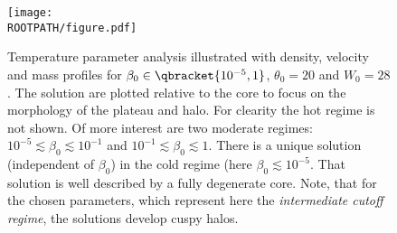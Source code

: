 \begin{figure}%
	\centering%
	\texttt{[image: \\ROOTPATH/figure.pdf]}
	\caption{Temperature parameter analysis illustrated with density, velocity and mass profiles for $\beta_0\in\qbracket{10^{-5},1}$, $\theta_0 = 20$ and $W_0 = 28$. The solution are plotted relative to the core to focus on the morphology of the plateau and halo. For clearity the hot regime is not shown. Of more interest are two moderate regimes: $10^{-5} \lesssim \beta_0 \lesssim 10^{-1}$ and $10^{-1} \lesssim \beta_0 \lesssim 1$. There is a unique solution (independent of $\beta_0$) in the cold regime (here $\beta_0 \lesssim 10^{-5}$. That solution is well described by a fully degenerate core. Note, that for the chosen parameters, which represent here the \textit{intermediate cutoff regime}, the solutions develop cuspy halos.}%
	\label{fig:profile:with-cutoff:beta0-intermediate:core}%
\end{figure}